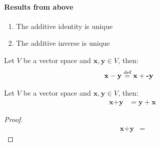 \documentclass[11pt]{article}
\begin{document}
\paragraph{Results from above}
\begin{enumerate}
    \item The additive identity is unique
    \item The additive inverse is unique
\end{enumerate}
\begin{definition}[Subtraction]
    Let $V$ be a vector space and $\textbf{x}, \textbf{y} \in V$, then:
    \begin{align*}
        \textbf{x} - \textbf{y} &\stackrel{\text{def}}{=} \textbf{x} + \textbf{-y}
    \end{align*}
\end{definition}
\begin{theorem}
    Let $V$ be a vector space and $\textbf{x}, \textbf{y} \in V$, then:
    \begin{align*}
        \textbf{x} + \textbf{y} &= \textbf{y} + \textbf{x}
    \end{align*} 
\end{theorem}
\begin{proof}
    \begin{align*}
        \textbf{x} + \textbf{y} &=  
    \end{align*}
\end{proof}   
\end{document}
